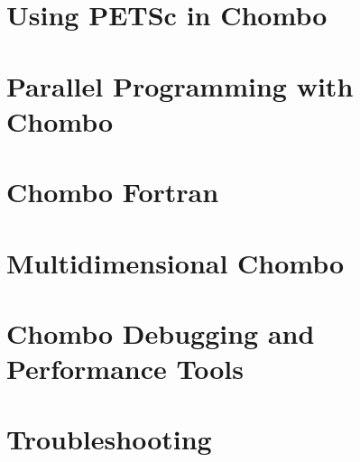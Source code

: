 \documentclass[12pt]{report}
\begin{document}
\chapter{Using PETSc in Chombo}


\chapter{Parallel Programming with Chombo}


\chapter{Chombo Fortran}


\chapter{Multidimensional Chombo \label{sec:multiDim}}


\chapter{Chombo Debugging and Performance Tools}




%

\chapter{Troubleshooting}




\end{document}
